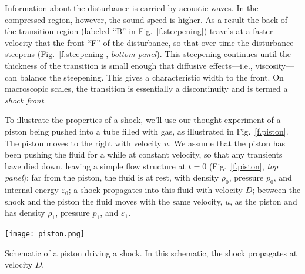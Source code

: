 Information about the disturbance is carried by acoustic waves.  In the compressed region, however, the sound speed is higher.  As a result the back of the transition region (labeled ``B'' in Fig.~\ref{f.steepening}) travels at a faster velocity that the front ``F'' of the disturbance, so that over time the disturbance steepens (Fig.~\ref{f.steepening}, \emph{bottom panel}). This steepening continues until the thickness of the transition is small enough that diffusive effects---i.e., viscosity---can balance the steepening.  This gives a characteristic width to the front.  On macroscopic scales, the transition is essentially a discontinuity and is termed a \emph{shock front}.

To illustrate the properties of a shock, we'll use our thought experiment of a piston being pushed into a tube filled with gas, as illustrated in Fig.~\ref{f.piston}.  The piston moves to the right with velocity $u$.  We assume that the piston has been pushing the fluid for a while at constant velocity, so that any transients have died down, leaving a simple flow structure at $t=0$ (Fig.~\ref{f.piston}, \emph{top panel}): far from the piston, the fluid is at rest, with density $\rho_{0}$, pressure $p_{0}$, and internal energy $\varepsilon_{0}$; a shock propagates into this fluid with velocity $D$; between the shock and the piston the fluid moves with the same velocity, $u$, as the piston and has density $\rho_{1}$, pressure $p_{1}$, and $\varepsilon_{1}$.

\begin{marginfigure}
\texttt{[image: piston.png]}
\caption[Schematic of a piston driving a shock.]{Schematic of a piston driving a shock.  In this schematic, the shock propagates at velocity $D$.}
\label{f.piston}
\end{marginfigure}

